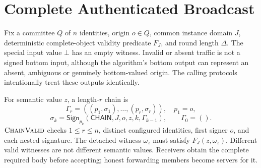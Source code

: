 \documentclass[11pt,a4paper,onecolumn]{article}
\newcommand{\Sig}{\mathsf{Sign}}
\newcommand{\botv}{\bot}
\newcommand{\Tag}[1]{\mathsf{#1}}
\newcommand{\Proc}[1]{\textnormal{\textsc{#1}}}
\theoremstyle{remark}\newtheorem{example}[definition]{Example}
\newcounter{protocol}
\begin{document}
\appendix
\section{Complete Authenticated Broadcast}\label{app:ab}
Fix a committee $Q$ of $n$ identities, origin $o\in Q$, common instance domain
$J$, deterministic complete-object validity predicate $F_J$, and round length
$\Delta$. The special input value $\botv$ has an empty witness. Invalid or absent
traffic is not a signed bottom input, although the algorithm's bottom output
can represent an absent, ambiguous or genuinely bottom-valued origin. The
calling protocols intentionally treat these outputs identically.

For semantic value $z$, a length-$r$ chain is
\[
 \Gamma_r=((p_1,\sigma_1),\ldots,(p_r,\sigma_r)),\quad p_1=o,
\]
\[
 \sigma_k=\Sig_{p_k}(\Tag{CHAIN},J,o,z,k,\Gamma_{k-1}),\qquad \Gamma_0=().
\]
$\Proc{ChainValid}$ checks $1\leq r\leq n$, distinct configured identities,
first signer $o$, and each nested signature. The detached witness $\omega_z$
must satisfy $F_J(z,\omega_z)$. Different valid witnesses are not different
semantic values. Receivers obtain the complete required body before accepting;
honest forwarding members become servers for it.
\end{document}

